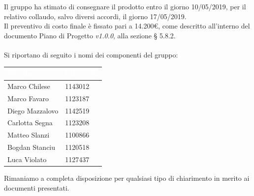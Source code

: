 \documentclass[11pt, a4paper]{letter} %
\begin{document}
\begin{letter}
\begin{itemize}
\end{itemize}
Il gruppo ha stimato di consegnare il prodotto entro il giorno 10/05/2019, per il relativo collaudo, salvo diversi accordi, il giorno 17/05/2019.\\  
Il preventivo di costo finale è fissato pari a 14.200€, come descritto all'interno del documento Piano di Progetto \textit{v1.0.0}, alla sezione § 5.8.2.\\
\-\\
Si riportano di seguito i nomi dei componenti del gruppo:
\begin{center}
\begin{longtable}[c]{|m{}m{}|} 
\hline
\rowcolor{bluelogo}\textbf{\textcolor{white}{Membro}}  & \textbf{\textcolor{white}{Matricola}}\\
\hline
Marco Chilese & 1143012\\
\hline
\rowcolor{grigio}Marco Favaro & 1123187\\ 
\hline
Diego Mazzalovo & 1142519\\
\hline
\rowcolor{grigio}Carlotta Segna & 1123208\\
\hline
Matteo Slanzi & 1100866\\
\hline
\rowcolor{grigio}Bogdan Stanciu  & 1120518\\
\hline
Luca Violato & 1127437\\
\hline
\end{longtable}
\end{center}

Rimaniamo a completa disposizione per qualsiasi tipo di chiarimento in merito ai documenti presentati.


\end{letter}
\end{document}
